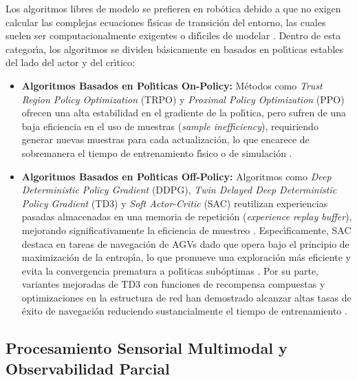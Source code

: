 Los algoritmos libres de modelo se prefieren en rob\'{o}tica debido a que no exigen calcular las complejas ecuaciones f\'{\i}sicas de transici\'{o}n del entorno, las cuales suelen ser computacionalmente exigentes o dif\'{\i}ciles de modelar \cite{Xue2022}. Dentro de esta categor\'{\i}a, los algoritmos se dividen b\'{a}sicamente en basados en pol\'{\i}ticas estables del lado del actor y del cr\'{\i}tico:

\begin{itemize}
    \item \textbf{Algoritmos Basados en Pol\'{\i}ticas On-Policy:} M\'{e}todos como \textit{Trust Region Policy Optimization} (TRPO) y \textit{Proximal Policy Optimization} (PPO) ofrecen una alta estabilidad en el gradiente de la pol\'{\i}tica, pero sufren de una baja eficiencia en el uso de muestras (\textit{sample inefficiency}), requiriendo generar nuevas muestras para cada actualizaci\'{o}n, lo que encarece de sobremanera el tiempo de entrenamiento f\'{\i}sico o de simulaci\'{o}n \cite{Sivashangaran2023}.
    \item \textbf{Algoritmos Basados en Pol\'{\i}ticas Off-Policy:} Algoritmos como \textit{Deep Deterministic Policy Gradient} (DDPG), \textit{Twin Delayed Deep Deterministic Policy Gradient} (TD3) y \textit{Soft Actor-Critic} (SAC) reutilizan experiencias pasadas almacenadas en una memoria de repetici\'{o}n (\textit{experience replay buffer}), mejorando significativamente la eficiencia de muestreo \cite{Sivashangaran2023, Xue2022}. Espec\'{\i}ficamente, SAC destaca en tareas de navegaci\'{o}n de AGVs dado que opera bajo el principio de maximizaci\'{o}n de la entrop\'{\i}a, lo que promueve una exploraci\'{o}n m\'{a}s eficiente y evita la convergencia prematura a pol\'{\i}ticas sub\'{o}ptimas \cite{Xue2022}. Por su parte, variantes mejoradas de TD3 con funciones de recompensa compuestas y optimizaciones en la estructura de red han demostrado alcanzar altas tasas de \'{e}xito de navegaci\'{o}n reduciendo sustancialmente el tiempo de entrenamiento \cite{Guo2025}.
\end{itemize}

\subsection{Procesamiento Sensorial Multimodal y Observabilidad Parcial}

